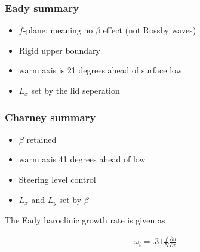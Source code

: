 \documentclass[a4paper,12pt]{article}
\begin{document}
\subsubsection*{Eady summary}
\begin{itemize}
	\item $f$-plane: meaning no $\beta$ effect (not Rossby waves)
	\item Rigid upper boundary
	\item warm axis is 21 degrees ahead of surface low
	\item $L_x$ set by the lid seperation
\end{itemize}

\subsubsection*{Charney summary}
\begin{itemize}
	\item $\beta$ retained
	\item warm axis 41 degrees ahead of low
	\item Steering level control
	\item $L_x$ and $L_y$ set by $\beta$
\end{itemize}

The Eady baroclinic growth rate is given as

\begin{align*}
\omega_i = .31 \frac{f}{N}\frac{\partial u}{\partial z}
\end{align*}
\end{document}
